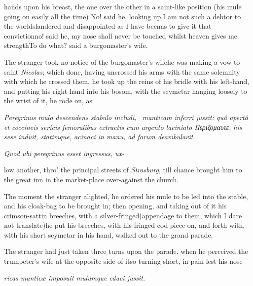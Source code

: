 \documentclass{article}
\begin{document}
\newpage
\noindent
hands upon his
breast, the one over the other in a
saint-like position (his mule going on easily all the time) No!
said he, looking up,\tsk I am not such a debtor to the
world\tsh slandered and disappointed as I have
been\tsk as to give it that conviction\tsk no! said he,
my nose shall never be touched whilst heaven gives me
strength\tsk To do what? said a burgomaster’s
wife.


The stranger took no notice of the burgomaster’s wife\tsh he was making a vow to
saint \textit{Nicolas}; which done, having uncrossed his arms with the same
solemnity with which he crossed them, he took up the reins of his bridle with his
left-hand, and putting his right hand into his bosom, with the scymetar hanging
loosely to the wrist of it, he rode on, as\break
{}

\newpage
\null{}\baselineskip
\textit{Peregrinus mulo descendens stabulo includi, \et\ manticam inferri jussit: quâ
aper\-tâ et coccineis sericis femoralibus extractis cum argento laciniato
{\small Περι\-ζο\-μαυτε}, his sese induit, statimque, acinaci in manu, ad forum deambulavit}.

\null{}\baselineskip
\textit{Quod ubi peregrinus esset ingressus, ux-\break
{}
}

\newpage\noindent
low another, thro’ the principal streets of \textit{Strasburg}, till chance
brought him to the great inn in the market-place over-against the church.

The moment the stranger alighted, he ordered his mule to be led into the stable, and
his cloak-bag to be brought in; then opening, and taking out of it his
crimson-sattin breeches, with a silver-fringed\tsk (appendage to them, which I dare
not translate)\tsk he put his breeches, with his fringed cod-piece on, and forth-with,
with his short scymetar in his hand, walked out to the grand parade.

The stranger had just taken three turns upon the parade, when he perceived the
trumpeter’s wife at the opposite side of it\tsk so turning short, in pain lest his
nose 

\newpage
\noindent\textit{ricas manticæ imposuit mulumque
educi jussit.}

\baselineskip
\end{document}
